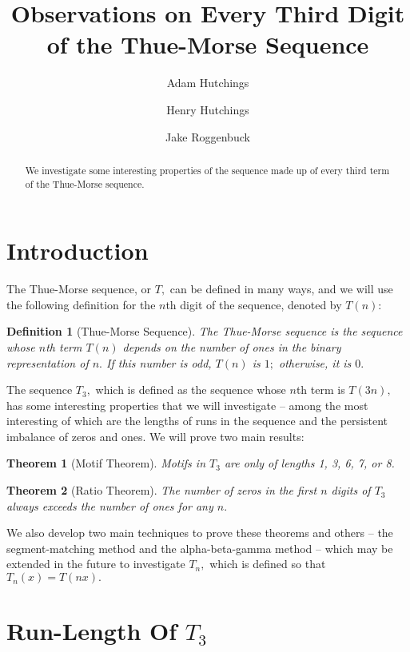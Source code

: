 \documentclass{article}
\newtheorem{theorem}{Theorem}[section]
\newtheorem{definition}{Definition}[section]
\begin{document}
\title{Observations on Every Third Digit of the Thue-Morse Sequence}
\author{
	Adam Hutchings
	\and
	Henry Hutchings
	\and
	Jake Roggenbuck
}
\maketitle

\begin{abstract}
We investigate some interesting properties of the sequence made up of every third term of the Thue-Morse sequence.
\end{abstract}

\tableofcontents

\section{Introduction}
The Thue-Morse sequence, or $T,$ can be defined in many ways, and we will use the following definition for the $n$th digit of the sequence, denoted by $T(n):$ 
\begin{definition}[Thue-Morse Sequence]
The Thue-Morse sequence is the sequence whose $n$th term $T(n)$ depends on the number of ones in the binary representation of $n.$ If this number is odd, $T(n)$ is $1;$ otherwise, it is $0.$
\end{definition}
The sequence $T_3,$ which is defined as the sequence whose $n$th term is $T(3n),$ has some interesting properties that we will investigate -- among the most interesting of which are the lengths of runs in the sequence and the persistent imbalance of zeros and ones. We will prove two main results:

\begin{theorem}[Motif Theorem]
\label{mlength}
Motifs in $T_3$ are only of lengths 1, 3, 6, 7, or 8.
\end{theorem}

\begin{theorem}[Ratio Theorem]
\label{ratio}
The number of zeros in the first $n$ digits of $T_3$ always exceeds the number of ones for any $n.$
\end{theorem}

We also develop two main techniques to prove these theorems and others -- the segment-matching method and the alpha-beta-gamma method -- which may be extended in the future to investigate $T_n,$ which is defined so that $T_n(x) = T(nx).$

\section{Run-Length Of $T_3$}
\end{document}
